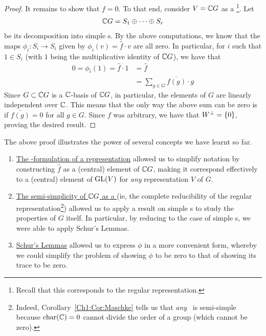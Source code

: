 \begin{proof}
    It remains to show that $f = 0$. To that end, consider $V = \mathbb{C} G$ as a \CGM\footnote{Recall that this corresponds to the regular representation.}. Let
    \begin{align*}
        \mathbb{C} G = S_1 \oplus \cdots \oplus S_r
    \end{align*}
    be its decomposition into simple \CGM s. By the above computations, we know that the maps $\phi_i : S_i \to S_i$ given by $\phi_i(v) = \hat{f} \cdot v$ are all zero. In particular, for $i$ such that $1 \in S_i$ (with $1$ being the multiplicative identity of $\mathbb{C} G$), we have that
    \begin{align*}
        0 = \phi_i(1) = \hat{f} \cdot 1 &= \hat{f} \\
        &= \sum_{g \in G} \overline{f(g)} \cdot g
    \end{align*}
    Since $G \subset \mathbb{C} G$ is a $\mathbb{C}$-basis of $\mathbb{C} G$, in particular, the elements of $G$ are linearly independent over $\mathbb{C}$. This means that the only way the above sum can be zero is if $\bar{f(g)} = 0$ for all $g \in G$. Since $f$ was arbitrary, we have that $W^\perp = \left\{ 0 \right\}$, proving the desired result.
\end{proof}

\begin{remark}
    The above proof illustrates the power of several concepts we have learnt so far.
    \begin{enumerate}
        \item \underline{The \CGM-formulation of a representation} allowed us to simplify notation by constructing $\hat{f}$ as a (central) element of $\mathbb{C} G$, making it correspond effectively to a (central) element of $\operatorname{GL}\!\left( V \right)$ for \textit{any} representation $V$ of $G$.
        \item \underline{The semi-simplicity of $\mathbb{C} G$ as a \CGM} (ie, the complete reducibility of the regular representation\footnote{Indeed, Corollary~\ref{Ch1:Cor:Maschke} tells us that \textit{any} \CGM\ is semi-simple because $\operatorname{char}\!\left( \mathbb{C} \right) = 0$ cannot divide the order of a group (which cannot be zero).}) allowed us to apply a result on simple \CGM s to study the properties of $G$ itself. In particular, by reducing to the case of simple \CGM s, we were able to apply Schur's Lemmas.
        \item \underline{Schur's Lemmas} allowed us to express $\phi$ in a more convenient form, whereby we could simplify the problem of showing $\phi$ to be zero to that of showing its trace to be zero.
    \end{enumerate}
\end{remark}
